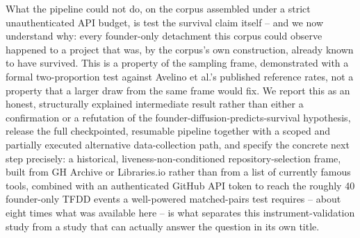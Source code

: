 \documentclass[11pt,letterpaper]{article}
\begin{document}
What the pipeline could not do, on the corpus assembled under a strict unauthenticated API budget, is test the survival claim itself -- and we now understand why: every founder-only detachment this corpus could observe happened to a project that was, by the corpus's own construction, already known to have survived. This is a property of the sampling frame, demonstrated with a formal two-proportion test against Avelino et al.'s published reference rates, not a property that a larger draw from the same frame would fix. We report this as an honest, structurally explained intermediate result rather than either a confirmation or a refutation of the founder-diffusion-predicts-survival hypothesis, release the full checkpointed, resumable pipeline together with a scoped and partially executed alternative data-collection path, and specify the concrete next step precisely: a historical, liveness-non-conditioned repository-selection frame, built from GH Archive or Libraries.io rather than from a list of currently famous tools, combined with an authenticated GitHub API token to reach the roughly 40 founder-only TFDD events a well-powered matched-pairs test requires -- about eight times what was available here -- is what separates this instrument-validation study from a study that can actually answer the question in its own title.
\end{document}
